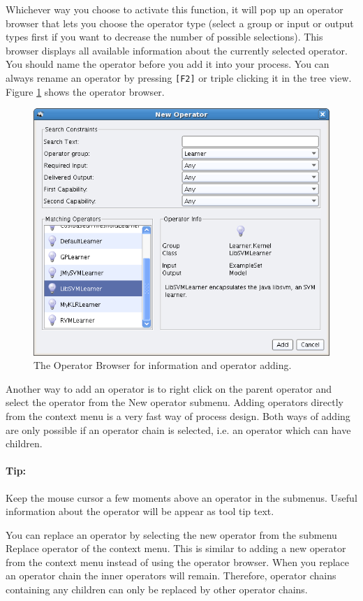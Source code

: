 \documentclass[11pt]{article}
\newcommand{\key}[1]{\texttt{[#1]}}
\newcommand{\useroption}[1]{\textsf{#1}}
\begin{document}
Whichever way you choose to activate this function, it
will pop up an operator browser that lets you choose the operator type
(select a group or input or output types first if you want to decrease
the number of possible selections). This browser displays all
available information about the currently selected operator. You
should name the operator before you add it into your
process. You can always rename an operator by pressing \key{F2} or
triple clicking it in the tree view. Figure
\ref{fig:operator_selection} shows the operator browser. 
\begin{figure}[ht]
\center
\includegraphics[width=0.88\linewidth]{operator_selection.png}
\caption{The Operator Browser for information and operator adding.}
\label{fig:operator_selection}
\end{figure}

Another way to add an operator is to right click on the parent
operator and select the operator from the \useroption{New operator}
submenu. Adding operators directly from the context menu is a very
fast way of process design. Both ways of adding are only possible
if an operator chain is selected, i.e. an operator which can have
children.

\paragraph{Tip:} Keep the mouse cursor a few moments above an
operator in the submenus. Useful information about the operator will
be appear as tool tip text.

\medskip

You can replace an operator by selecting the new operator from the
submenu \useroption{Replace operator} of the context menu. This is
similar to adding a new operator from the context menu instead of
using the operator browser. When you replace an operator chain 
the inner operators will remain. Therefore, operator chains containing
any children can only be replaced by other operator chains.
\end{document}
